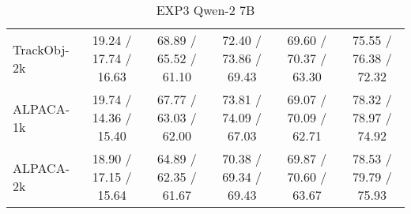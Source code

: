 \begin{table*}[h]
\begin{tabular}{lccccc}
TrackObj-2k
& 
19.24 / 17.74 / 16.63
& 68.89 / 65.52 / 61.10
& 72.40 / 73.86 / 69.43
& 
69.60 / 70.37 / 63.30
& 




75.55 / 76.38 / 72.32
\\

ALPACA-1k
& 
19.74 / 14.36 / 15.40
& 67.77 / 63.03 / 62.00
& 73.81 / 74.09 / 67.03
& 69.07 / 70.09 / 62.71
& 
78.32 / 78.97 / 74.92
\\

ALPACA-2k& 
18.90 / 17.15 / 15.64& 64.89 / 62.35 / 61.67
& 70.38 / 69.34 / 69.43
& 
69.87 / 70.60 / 63.67& 





78.53 / 79.79 / 75.93\\
\bottomrule
\end{tabular}
\caption{EXP3 Qwen-2 7B}
\label{tab:EXP3 Qwen-2 7B}
\end{table*}


